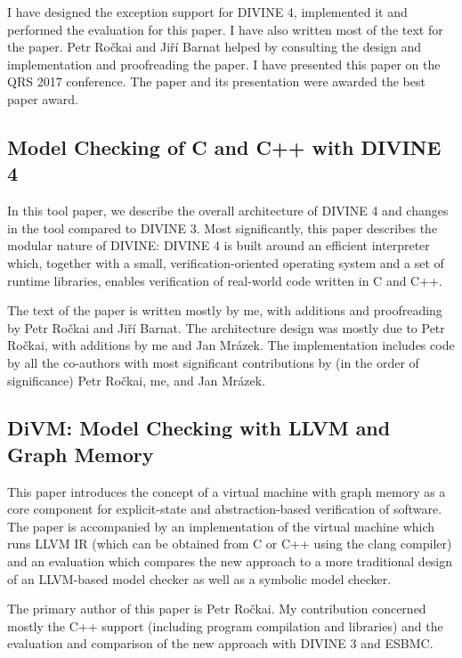 I have designed the exception support for DIVINE 4, implemented it and performed the evaluation for this paper.
I have also written most of the text for the paper.
Petr Ročkai and Jiří Barnat helped by consulting the design and implementation and proofreading the paper.
I have presented this paper on the QRS 2017 conference.
The paper and its presentation were awarded the best paper award.

\bigskip\noindent{}

\subsection*{Model Checking of C and C++ with DIVINE 4}

In this tool paper, we describe the overall architecture of DIVINE 4 and changes in the tool compared to DIVINE 3.
Most significantly, this paper describes the modular nature of DIVINE: DIVINE 4 is built around an efficient interpreter which, together with a small, verification-oriented operating system and a set of runtime libraries, enables verification of real-world code written in C and C++.

The text of the paper is written mostly by me, with additions and proofreading by Petr Ročkai and Jiří Barnat.
The architecture design was mostly due to Petr Ročkai, with additions by me and Jan Mrázek.
The implementation includes code by all the co-authors with most significant contributions by (in the order of significance) Petr Ročkai, me, and Jan Mrázek.

\bigskip\noindent{}

\subsection*{DiVM: Model Checking with LLVM and Graph Memory}

This paper introduces the concept of a virtual machine with graph memory as a core component for explicit-state and abstraction-based verification of software.
The paper is accompanied by an implementation of the virtual machine which runs LLVM IR (which can be obtained from C or C++ using the clang compiler) and an evaluation which compares the new approach to a more traditional design of an LLVM-based model checker as well as a symbolic model checker.

The primary author of this paper is Petr Ročkai.
My contribution concerned mostly the C++ support (including program compilation and libraries) and the evaluation and comparison of the new approach with DIVINE 3 and ESBMC.

